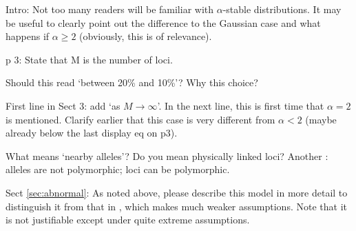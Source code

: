 \begin{point}{}
Intro: Not too many readers will be familiar with $\alpha$-stable distributions. It may be
useful to clearly point out the difference to the Gaussian case and what happens if $\alpha \ge 2$
(obviously, this is of relevance).
\end{point}


\begin{point}{}
p 3: State that M is the number of loci.
\end{point}


\begin{point}{\revref}
Should this read ‘between 20\% and 10\%’? Why this choice?
\end{point}


\begin{point}{\revref}
First line in Sect 3: add ‘as $M \to \infty$’. In the next line, this is first time that $\alpha = 2$ is
mentioned. Clarify earlier that this case is very different from $\alpha < 2$ (maybe already below
the last display eq on p3).
\end{point}


\begin{point}{\revref}
What means `nearby alleles'? Do you mean physically linked
    loci? Another : alleles are not polymorphic; loci can be polymorphic.
\end{point}


\begin{point}{}
Sect \ref{sec:abnormal}: As noted above, please describe this model in more detail to distinguish it
from that in \citet{barton2017infinitesimal}, which makes much weaker assumptions. Note that it is
not justifiable except under quite extreme assumptions.
\end{point}

